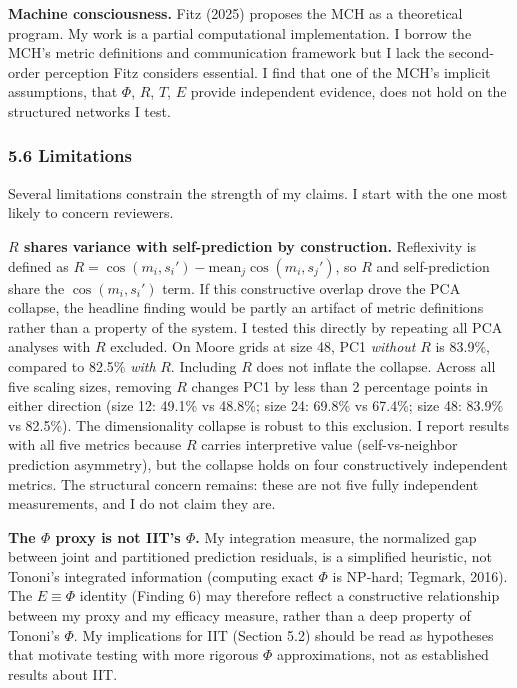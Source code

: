 \documentclass[
  11pt,
]{article}
\begin{document}
\textbf{Machine consciousness.} Fitz (2025) proposes the MCH as a
theoretical program. My work is a partial computational implementation.
I borrow the MCH's metric definitions and communication framework but I
lack the second-order perception Fitz considers essential. I find that
one of the MCH's implicit assumptions, that \(\Phi\), \(R\), \(T\),
\(E\) provide independent evidence, does not hold on the structured
networks I test.

\subsubsection{5.6 Limitations}\label{limitations}

Several limitations constrain the strength of my claims. I start with
the one most likely to concern reviewers.

\textbf{\(R\) shares variance with self-prediction by construction.}
Reflexivity is defined as
\(R = \cos(m_i, s_i') - \text{mean}_{j} \cos(m_i, s_j')\), so \(R\) and
self-prediction share the \(\cos(m_i, s_i')\) term. If this constructive
overlap drove the PCA collapse, the headline finding would be partly an
artifact of metric definitions rather than a property of the system. I
tested this directly by repeating all PCA analyses with \(R\) excluded.
On Moore grids at size 48, PC1 \emph{without} \(R\) is 83.9\%, compared
to 82.5\% \emph{with} \(R\). Including \(R\) does not inflate the
collapse. Across all five scaling sizes, removing \(R\) changes PC1 by
less than 2 percentage points in either direction (size 12: 49.1\% vs
48.8\%; size 24: 69.8\% vs 67.4\%; size 48: 83.9\% vs 82.5\%). The
dimensionality collapse is robust to this exclusion. I report results
with all five metrics because \(R\) carries interpretive value
(self-vs-neighbor prediction asymmetry), but the collapse holds on four
constructively independent metrics. The structural concern remains:
these are not five fully independent measurements, and I do not claim
they are.

\textbf{The \(\Phi\) proxy is not IIT's \(\Phi\).} My integration
measure, the normalized gap between joint and partitioned prediction
residuals, is a simplified heuristic, not Tononi's integrated
information (computing exact \(\Phi\) is NP-hard; Tegmark, 2016). The
\(E \equiv \Phi\) identity (Finding 6) may therefore reflect a
constructive relationship between my proxy and my efficacy measure,
rather than a deep property of Tononi's \(\Phi\). My implications for
IIT (Section 5.2) should be read as hypotheses that motivate testing
with more rigorous \(\Phi\) approximations, not as established results
about IIT.
\end{document}
